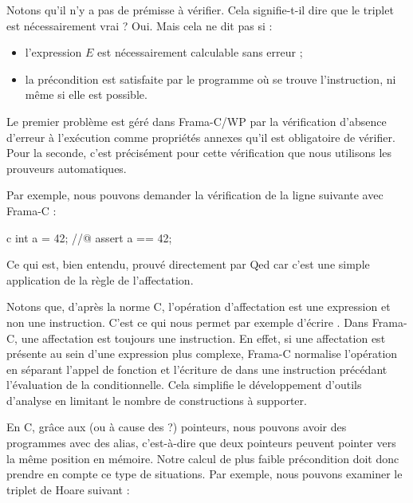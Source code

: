 Notons qu'il n'y a pas de prémisse à vérifier. Cela signifie-t-il dire que le
triplet est nécessairement vrai ? Oui. Mais cela ne dit pas si :
\begin{itemize}
  \item l'expression $E$ est nécessairement calculable sans erreur ;
  \item la précondition est satisfaite par le programme où se trouve
        l'instruction, ni même si elle est possible.
\end{itemize}
Le premier problème est géré dans Frama-C/WP par la vérification d'absence
d'erreur à l'exécution comme propriétés annexes qu'il est obligatoire de
vérifier. Pour la seconde, c'est précisément pour cette vérification que nous
utilisons les prouveurs automatiques.



Par exemple, nous pouvons demander la vérification de la ligne suivante avec
Frama-C :



\begin{CodeBlock}{c}
int a = 42;
//@ assert a == 42;
\end{CodeBlock}



Ce qui est, bien entendu, prouvé directement par Qed car c'est une simple
application de la règle de l'affectation.



\begin{Information}
Notons que, d'après la norme C, l'opération d'affectation est une expression
et non une instruction. C'est ce qui nous permet par exemple d'écrire
. Dans Frama-C, une affectation est toujours
une instruction. En effet, si une affectation est présente au sein d'une
expression plus complexe, Frama-C normalise l'opération en séparant l'appel de
fonction et l'écriture de  dans une instruction précédant l'évaluation
de la conditionnelle. Cela simplifie le développement d'outils d'analyse en
limitant le nombre de constructions à supporter.
\end{Information}





En C, grâce aux (ou à cause des ?) pointeurs, nous pouvons avoir des programmes
avec des alias, c'est-à-dire que deux pointeurs peuvent pointer vers la même
position en mémoire. Notre calcul de plus faible précondition doit donc prendre
en compte ce type de situations. Par exemple, nous pouvons examiner le triplet
de Hoare suivant :


